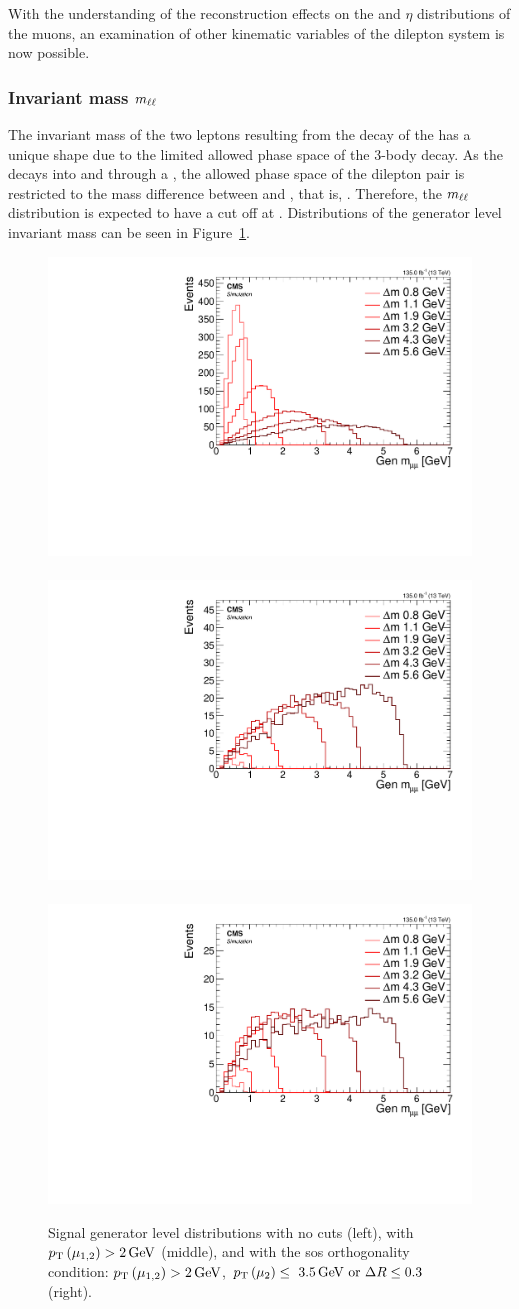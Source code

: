 With the understanding of the reconstruction effects on the \pt and $\eta$ distributions of the muons, an examination of other kinematic variables of the dilepton system is now possible.

\clearpage

\subsubsection{Invariant mass $m_{\ell\ell}$}
\label{sec:gen-invariant-mass}

The invariant mass of the two leptons resulting from the decay of the \neutt has a unique shape due to the limited allowed phase space of the 3-body decay. As the \neutt decays into \neuto and \ellell through a \PZstar, the allowed phase space of the dilepton pair is restricted to the mass difference between \neutt and \neuto, that is, \dm. Therefore, the $m_{\ell\ell}$ distribution is expected to have a cut off at \dm. Distributions of the generator level invariant mass can be seen in Figure~\ref{fig:signal-generator-mll}.

\begin{figure}[!htb]
\centering
\includegraphics[width=0.32\linewidth]{plots/signal_muons_gen/none_gen_invMass.pdf} \,
\includegraphics[width=0.32\linewidth]{plots/signal_muons_gen/none_gen_invMass_cut.pdf}  \,
\includegraphics[width=0.32\linewidth]{plots/signal_muons_gen/none_gen_invMass_orth.pdf} \\
\caption[Signal generator level \mll distributions]{ Signal generator level \mll distributions with no cuts (left), with $p_{\mathrm{T}}\left(\mu_{1,2}\right)>2\,\text{Ge\hspace{-.08em}V}$ (middle), and with the \gls{sos} orthogonality condition: $p_{\mathrm{T}}\left(\mu_{1,2}\right)>2\,\text{Ge\hspace{-.08em}V}$, $p_{\mathrm{T}}\left(\mu_2\right)\leq~3.5\,\text{Ge\hspace{-.08em}V}\text{ or }\Delta R\leq 0.3$ (right).}
\label{fig:signal-generator-mll}
\end{figure}

